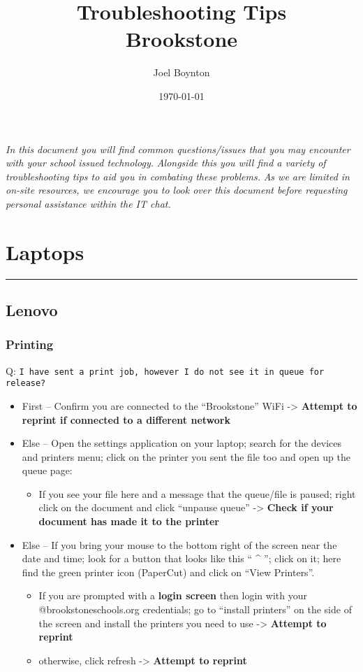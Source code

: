 \documentclass[11pt]{article}
\author{Joel Boynton}
\date{\today}
\title{Troubleshooting Tips\\\medskip
\large Brookstone}
\begin{document}
\maketitle
\begin{center}
\emph{In this document you will find common questions/issues that you may encounter with your school issued technology.}
\emph{Alongside this you will find a variety of troubleshooting tips to aid you in combating these problems.}
\emph{As we are limited in on-site resources, we encourage you to look over this document before requesting personal assistance within the IT chat.}
\end{center}
\tableofcontents \clearpage
\section{Laptops}
\label{sec:orgee96981}
\noindent\rule{\textwidth}{0.5pt}
\subsection{Lenovo}
\label{sec:orge181aa7}
\subsubsection{Printing}
\label{sec:orgd993fc9}
Q: \texttt{I have sent a print job, however I do not see it in queue for release?}
\begin{itemize}
\item First -- Confirm you are connected to the ``Brookstone'' WiFi -> \textbf{Attempt to reprint if connected to a different network}
\item Else -- Open the settings application on your laptop; search for the devices and printers menu; click on the printer you sent the file too and open up the queue page:
\begin{itemize}
\item If you see your file here and a message that the queue/file is paused; right click on the document and click ``unpause queue'' -> \textbf{Check if your document has made it to the printer}
\end{itemize}

\item Else -- If you bring your mouse to the bottom right of the screen near the date and time; look for a button that looks like this `` \^{} ''; click on it; here find the green printer icon (PaperCut) and click on ``View Printers''.
\begin{itemize}
\item If you are prompted with a \textbf{login screen} then login with your @brookstoneschools.org credentials; go to ``install printers'' on the side of the screen and install the printers you need to use -> \textbf{Attempt to reprint}
\item otherwise, click refresh -> \textbf{Attempt to reprint}
\end{itemize}
\end{itemize}
\end{document}
